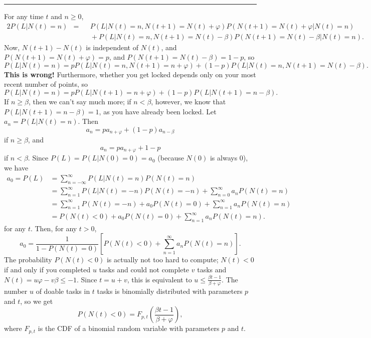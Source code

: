 \documentclass[letterpaper]{article}
\begin{document}
\vspace{1em}
\hrule
\vspace{1em}
For any time $t$ and $n \ge 0$,
\begin{alignat*}{2}
	P(L | N(t){=}n) &{}={}&& P(L | N(t){=}n, N(t+1){=}N(t) + \varphi)P(N(t+1){=}N(t)+\varphi|N(t){=}n) \\
	&&&{}+ P(L|N(t){=}n,N(t+1){=}N(t)-\beta)P(N(t+1){=}N(t)-\beta|N(t){=}n).
\end{alignat*}
Now, $N(t+1) - N(t)$ is independent of $N(t)$, and $P(N(t+1){=}N(t) + \varphi) = p$, and $P(N(t+1){=}N(t)-\beta) = 1-p$, so
\begin{equation*}
	P(L|N(t){=}n) = pP(L|N(t){=}n, N(t+1){=}n+\varphi) + (1-p)P(L|N(t){=}n, N(t+1){=}N(t)-\beta).
\end{equation*}
\textbf{This is wrong!}
Furthermore, whether you get locked depends only on your most recent number of points, so
\begin{equation*}
	P(L|N(t){=}n) = pP(L|N(t+1){=}n+\varphi) + (1-p)P(L|N(t+1){=}n-\beta).
\end{equation*}
If $n \ge \beta$, then we can't say much more; if $n < \beta$, however, we know that \\$P(L|N(t+1){=}n-\beta) = 1$, as you have already been locked.
Let $a_n = P(L|N(t){=}n)$. Then
\begin{equation*}
	a_n = pa_{n+\varphi} + (1-p)a_{n-\beta}
\end{equation*}
if $n \ge \beta$, and
\begin{equation*}
	a_n = pa_{n+\varphi} + 1 - p
\end{equation*}
if $n < \beta$.
Since $P(L) = P(L|N(0) {=}0) = a_0$ (because $N(0)$ is always 0), we have
\begin{align*}
	a_0 = P(L) &= \sum_{n=-\infty}^\infty P(L|N(t){=}n)P(N(t){=}n) \\
	&= \sum_{n=1}^{\infty}P(L|N(t){=}{-n})P(N(t){=}{-n}) + \sum_{n=0}^\infty a_n P(N(t){=}n) \\
	&= \sum_{n=1}^\infty P(N(t){=}{-n}) + a_0 P(N(t){=}0) + \sum_{n=1}^\infty a_nP(N(t){=}n) \\
	&= P(N(t) {<}0) + a_0P(N(t){=}0) + \sum_{n=1}^\infty a_nP(N(t){=}n).
\end{align*}
for any $t$. Then, for any $t>0$,
\begin{equation*}
	a_0 = \frac{1}{1-P(N(t){=}0)}\left[P(N(t){<} 0) + \sum_{n=1}^\infty a_nP(N(t){=}n)\right].
\end{equation*}
The probability $P(N(t){<}0)$ is actually not too hard to compute; $N(t) < 0$ if and only if you completed $u$ tasks and could not complete $v$ tasks and \\$N(t) = u\varphi - v\beta \le -1$. Since $t = u + v$, this is equivalent to $u \le \frac{\beta t- 1}{\beta + \varphi}$. The number $u$ of doable tasks in $t$ tasks is binomially distributed with parameters $p$ and $t$, so we get
\begin{equation*}
	P(N(t){<}0) = F_{p,t}\left(\frac{\beta t - 1}{\beta+\varphi}\right),
\end{equation*}
where $F_{p,t}$ is the CDF of a binomial random variable with parameters $p$ and $t$.
\end{document}
